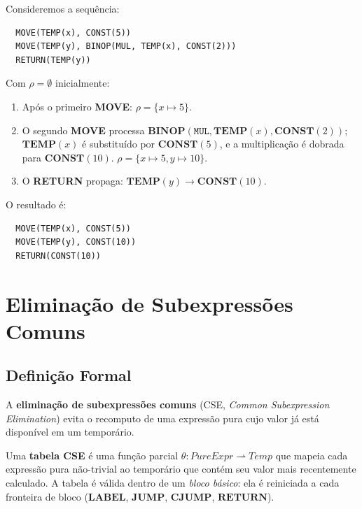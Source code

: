 \begin{example}
  Consideremos a sequência:
  \begin{verbatim}
  MOVE(TEMP(x), CONST(5))
  MOVE(TEMP(y), BINOP(MUL, TEMP(x), CONST(2)))
  RETURN(TEMP(y))
  \end{verbatim}
  Com $\rho = \emptyset$ inicialmente:
  \begin{enumerate}
    \item Após o primeiro \textbf{MOVE}: $\rho = \{x \mapsto 5\}$.
    \item O segundo \textbf{MOVE} processa
      $\mathbf{BINOP}(\mathtt{MUL}, \mathbf{TEMP}(x), \mathbf{CONST}(2))$;
      $\mathbf{TEMP}(x)$ é substituído por $\mathbf{CONST}(5)$, e a
      multiplicação
      é dobrada para $\mathbf{CONST}(10)$. $\rho = \{x \mapsto 5, y
      \mapsto 10\}$.
    \item O \textbf{RETURN} propaga: $\mathbf{TEMP}(y) \to \mathbf{CONST}(10)$.
  \end{enumerate}
  O resultado é:
  \begin{verbatim}
  MOVE(TEMP(x), CONST(5))
  MOVE(TEMP(y), CONST(10))
  RETURN(CONST(10))
  \end{verbatim}
\end{example}

\section{Eliminação de Subexpressões Comuns}\label{sec:opt-cse}

\subsection{Definição Formal}

A \textbf{eliminação de subexpressões comuns} (CSE, \emph{Common Subexpression
Elimination}) evita o recomputo de uma expressão pura cujo valor já está
disponível em um temporário.

\begin{Definition}\label{def:cse-table}
  Uma \textbf{tabela CSE} é uma função parcial
  $\theta : \mathit{PureExpr} \rightharpoonup \mathit{Temp}$
  que mapeia cada expressão pura não-trivial ao temporário que contém seu valor
  mais recentemente calculado.
  A tabela é válida dentro de um \emph{bloco básico}: ela é reiniciada a cada
  fronteira de bloco ($\mathbf{LABEL}$, $\mathbf{JUMP}$, $\mathbf{CJUMP}$,
  $\mathbf{RETURN}$).
\end{Definition}

